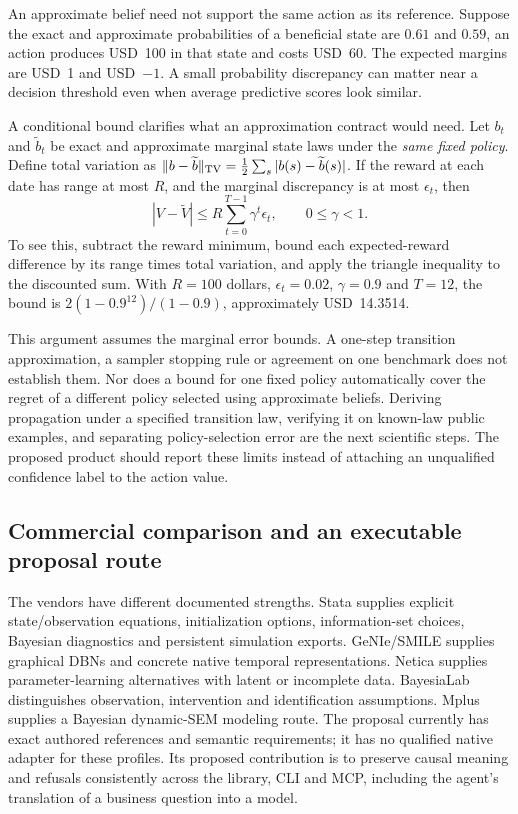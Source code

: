 An approximate belief need not support the same action as its reference. Suppose
the exact and approximate probabilities of a beneficial state are $0.61$ and
$0.59$, an action produces USD~100 in that state and costs USD~60. The expected
margins are USD~1 and USD~$-1$. A small probability discrepancy can matter near a
decision threshold even when average predictive scores look similar.

A conditional bound clarifies what an approximation contract would need. Let
$b_t$ and $\widetilde b_t$ be exact and approximate marginal state laws under
the \emph{same fixed policy}. Define total variation as
$\|b-\widetilde b\|_{\rm TV}=\frac12\sum_s|b(s)-\widetilde b(s)|$.
If the reward at each date has range at most $R$, and the marginal discrepancy
is at most $\epsilon_t$, then
\begin{equation}
 |V-\widetilde V|\leq
 R\sum_{t=0}^{T-1}\gamma^t\epsilon_t,\qquad 0\leq\gamma<1.
 \label{exec22:state-bound}
\end{equation}
To see this, subtract the reward minimum, bound each expected-reward difference
by its range times total variation, and apply the triangle inequality to the
discounted sum. With $R=100$ dollars, $\epsilon_t=0.02$, $\gamma=0.9$ and
$T=12$, the bound is
$2(1-0.9^{12})/(1-0.9)$, approximately USD~14.3514.
\citep{exec22_state_reference}

This argument assumes the marginal error bounds. A one-step transition
approximation, a sampler stopping rule or agreement on one benchmark does not
establish them. Nor does a bound for one fixed policy automatically cover the
regret of a different policy selected using approximate beliefs. Deriving
propagation under a specified transition law, verifying it on known-law public
examples, and separating policy-selection error are the next scientific steps.
The proposed product should report these limits instead of attaching an
unqualified confidence label to the action value.

\subsection{Commercial comparison and an executable proposal route}
\label{exec22:state-comparison}

The vendors have different documented strengths. Stata supplies explicit
state/observation equations, initialization options, information-set choices,
Bayesian diagnostics and persistent simulation exports. GeNIe/SMILE supplies
graphical DBNs and concrete native temporal representations. Netica supplies
parameter-learning alternatives with latent or incomplete data. BayesiaLab
distinguishes observation, intervention and identification assumptions. Mplus
supplies a Bayesian dynamic-SEM modeling route. The proposal currently has
exact authored references and semantic requirements; it has no qualified native
adapter for these profiles. Its proposed contribution is to preserve causal
meaning and refusals consistently across the library, CLI and MCP, including
the agent's translation of a business question into a model.

